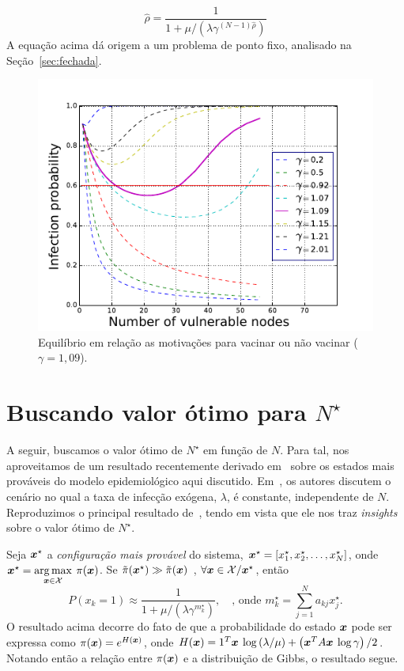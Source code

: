 		\begin{equation}
			\hat{\rho} =   \frac{1}  {1+ \mu/(\lambda \gamma^{(N-1)\hat{\rho}} )  }  \label{eq:mainlema1} %
		\end{equation} 
	    A equação acima dá origem a um problema de ponto fixo, analisado na Seção~\ref{sec:fechada}.

        \begin{figure}[!htb]
    		\centering
    	    \hspace{-0.2in}	
            \includegraphics[width=0.49\columnwidth,keepaspectratio=true]{./img/scaled_sis_lambda_10_EN_curves.pdf}
    		\caption{Equilíbrio em relação as motivações para vacinar ou não vacinar ($\gamma=1,09$).}
    		\label{fig:equilibrim_cost}
        \end{figure}


	\section{Buscando valor ótimo para  \texorpdfstring{$N^{\star}$}{N*}}
	\label{sec:otimon}
		A seguir, buscamos o valor ótimo de $N^{\star}$ em função de $N$.  Para tal, nos aproveitamos de um resultado recentemente derivado em~\cite{zhang2018more} sobre os estados mais prováveis do modelo epidemiológico  aqui discutido. Em~\cite{zhang2018more}, os autores discutem o cenário no qual  a taxa de infecção exógena, $\lambda$, é constante, independente de $N$.   Reproduzimos o principal resultado de~\cite{zhang2018more}, tendo em vista que ele  nos traz \emph{insights} sobre o valor ótimo de $N^{\star}$. 

		Seja $\boldsymbol {x}^{\star}$ a \textit{configuração mais provável} do sistema,  $\boldsymbol {x}^{\star} = [x_1^{\star}, x_2^{\star}, \ldots, x_{N}^{\star}]$, onde $\boldsymbol {x}^{\star} = \operatorname*{arg\,max}\limits_{\boldsymbol {x} \in \mathcal{X}} \: \pi(\boldsymbol {x})$. 
		Se $\tilde{\pi}(\boldsymbol {x}^{\star}) \gg \tilde{\pi}(\boldsymbol {x})$ , $\forall \boldsymbol {x} \in \mathcal{X}\slash \boldsymbol {x}^{\star}$, então 
        \begin{equation}
        	P(x_{k} =1) \approx  \frac{1}{1+\mu/\left(\lambda\gamma^{m_{k}^{\star}}\right)}, \quad \textrm{, onde }  m_{k}^{\star}=\sum\limits_{j=1}^{N} a_{kj}x_{j}^{\star}. \label{eq:aproximacao_Zhang}
        \end{equation}
		O resultado acima decorre do fato de que a probabilidade do estado $\boldsymbol {x}$ pode ser expressa como $\pi(\boldsymbol {x})=e^{H(\boldsymbol {x})}$, onde $H(\boldsymbol {x})=1^{T} \boldsymbol {x} \: \log \left( {\lambda}/{\mu} \right) + \left( \boldsymbol {x}^{T} A \boldsymbol {x} \: \log \gamma\right) /2$.  Notando então a  relação entre $\pi(\boldsymbol {x})$ e a distribuição de Gibbs, o resultado segue.
        
